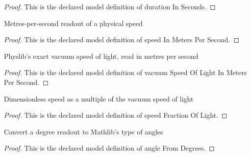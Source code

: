 \begin{proof}
  This is the declared model definition of duration In Seconds.
\end{proof}
\begin{definition}
  \label{def:physics:phyx-mini-0594:phyxminiproblems-problemphyxmini0594-speedinmeterspersecond}
  Metres-per-second readout of a physical speed
\end{definition}
\begin{proof}
  This is the declared model definition of speed In Meters Per Second.
\end{proof}
\begin{definition}
  \label{def:physics:phyx-mini-0594:phyxminiproblems-problemphyxmini0594-vacuumspeedoflightinmeterspersecond}
  Physlib's exact vacuum speed of light, read in metres per second
\end{definition}
\begin{proof}
  This is the declared model definition of vacuum Speed Of Light In Meters Per Second.
\end{proof}
\begin{definition}
  \label{def:physics:phyx-mini-0594:phyxminiproblems-problemphyxmini0594-speedfractionoflight}
  Dimensionless speed as a multiple of the vacuum speed of light
\end{definition}
\begin{proof}
  This is the declared model definition of speed Fraction Of Light.
\end{proof}
\begin{definition}
  \label{def:physics:phyx-mini-0594:phyxminiproblems-problemphyxmini0594-anglefromdegrees}
  Convert a degree readout to Mathlib's type of angles
\end{definition}
\begin{proof}
  This is the declared model definition of angle From Degrees.
\end{proof}
